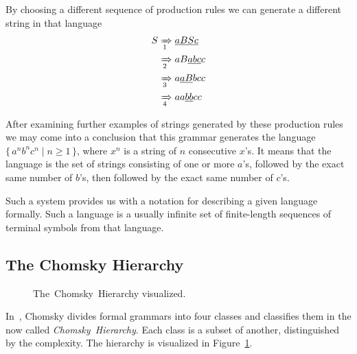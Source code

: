 \documentclass[english,bachelors,forcepolishlogotype]{wizthesis}
\begin{document}
By choosing a different sequence of production rules we can generate a different
string in that language
\begin{equation*}
\begin{split}
  S & \xRightarrow[1]{} \underline{aBSc} \\
    & \xRightarrow[2]{} aB\underline{abc}c \\
    & \xRightarrow[3]{} a\underline{aB}bcc \\
    & \xRightarrow[4]{} aa\underline{bb}cc
\end{split}
\end{equation*}

After examining further examples of strings generated by these production rules
we may come into a conclusion that this grammar generates the language
$\{\,a^nb^nc^n \mid n \ge 1\,\}$, where $x^n$ is a string of $n$ consecutive $x$'s.
It means that the language is the set of strings consisting of one or more
$a$'s, followed by the exact same number of $b$'s, then followed by the exact
same number of $c$'s.

Such a system provides us with a notation for describing a given
language formally. Such a language is a usually infinite set of finite-length
sequences of terminal symbols from that language.

\subsection{The Chomsky Hierarchy}

\begin{figure}
  \centering
  \caption{The~Chomsky~Hierarchy visualized.}
  \label{fig:chomsky-hierarchy}
\end{figure}

In~\cite{chomsky-1956}, Chomsky divides formal grammars into four classes and
classifies them in the now called \emph{Chomsky~Hierarchy}. Each class is a
subset of another, distinguished by the complexity. The hierarchy is visualized
in Figure~\ref{fig:chomsky-hierarchy}.
\end{document}
